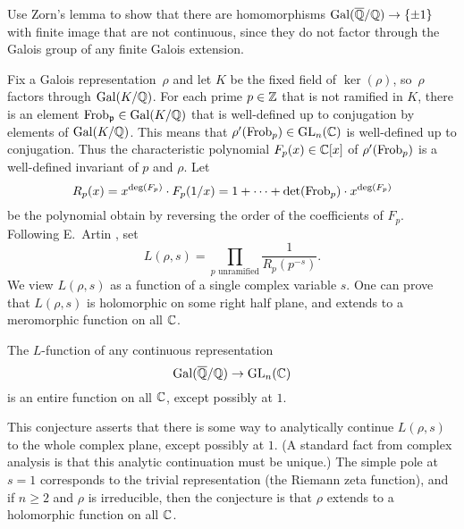 {\begin{exercise}
	\begin{hint}
		Use Zorn's lemma to show that there are homomorphisms
		$\operatorname{Gal}(\overline{\mathbb{Q}}/\mathbb{Q})\to\{\pm 1\}$ with finite image that are not continuous,
		since they do not factor through the Galois group of any
		finite Galois extension.
	\end{hint}
	
\end{exercise}

Fix a Galois representation~$\rho$ and let $K$ be the fixed field of
$\ker(\rho)$, so~$\rho$ factors through $\operatorname{Gal}(K/\mathbb{Q})$.  For each prime
$p\in\mathbb{Z}$ that is not ramified in $K$, there is an element
$\operatorname{Frob}_{\mathfrak{p}}\in\operatorname{Gal}(K/\mathbb{Q})$ that is well-defined up to conjugation by
elements of $\operatorname{Gal}(K/\mathbb{Q})$.  This means that $\rho'(\operatorname{Frob}_p)\in
\operatorname{GL}_n(\mathbb{C})$ is well-defined up to conjugation.  Thus the characteristic
polynomial $F_p(x)\in\mathbb{C}[x]$ of $\rho'(\operatorname{Frob}_p)$ is a well-defined
invariant of $p$ and $\rho$.  Let
$$
	R_p(x)
	= x^{\deg(F_p)}\cdot F_p(1/x)
	= 1 + \cdots + \det(\operatorname{Frob}_p)\cdot x^{\deg(F_p)}
$$
be the polynomial obtain
by reversing the order of the coefficients of $F_p$.
Following E.~Artin \cite{artin:conjecture, artin:conjecture2}, set
\begin{equation}\label{eqn:artin}
	L(\rho,s) = \prod_{p\text{ unramified}}\frac{1}{R_p(p^{-s})}.
\end{equation}
We view $L(\rho,s)$ as a function of a single complex variable $s$.
One can prove that $L(\rho,s)$ is holomorphic on some right
half plane, and extends to a meromorphic function on all $\mathbb{C}$.
\begin{conjecture}[Artin]\label{conj:artin}
	The $L$-function of any continuous representation
	$$
		\operatorname{Gal}(\overline{\mathbb{Q}}/\mathbb{Q})\to\operatorname{GL}_n(\mathbb{C})
	$$
	is an entire function on all $\mathbb{C}$, except possibly at $1$.
\end{conjecture}
This conjecture asserts that there is some way to analytically continue
$L(\rho,s)$ to the whole complex plane, except possibly at $1$.
(A standard fact from complex analysis is that this analytic
continuation must be unique.)
The simple pole at $s=1$ corresponds to the trivial representation (the
Riemann zeta function), and if $n\geq 2$ and $\rho$ is irreducible,
then the conjecture is that $\rho$ extends to a holomorphic function
on all $\mathbb{C}$.

}
